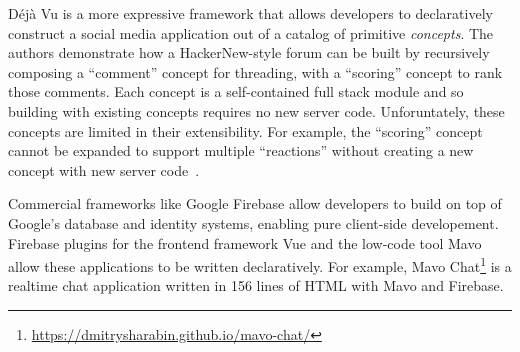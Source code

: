

Déjà Vu is a more expressive framework that allows developers
to declaratively construct a social media application out
of a catalog of primitive \emph{concepts}.
The authors demonstrate how a HackerNew-style forum can be built by
recursively composing a ``comment'' concept for threading,
with a ``scoring'' concept to rank those comments.
Each concept is a self-contained full stack module
and so building with existing concepts requires no new server code.
Unforuntately, these concepts are limited in their extensibility.
For example, the ``scoring'' concept cannot be expanded
to support multiple ``reactions''
without creating a new concept with new server code~\cite{dejavu}.

Commercial frameworks like Google Firebase allow developers
to build on top of Google's database and identity systems,
enabling pure client-side developement.
Firebase plugins for the frontend framework Vue and the low-code tool
Mavo~\cite{mavo} allow these applications to be written declaratively.
For example, Mavo Chat\footnote{
    \url{https://dmitrysharabin.github.io/mavo-chat/}
} is a realtime chat application written in 156 lines of HTML
with Mavo and Firebase.


